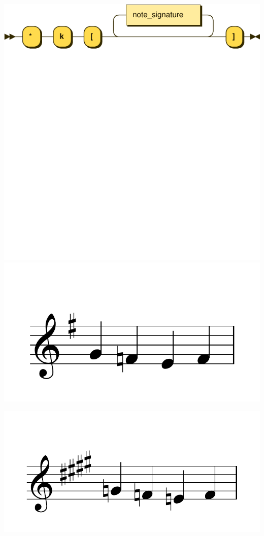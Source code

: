 \documentclass{article}
\begin{document}
\includegraphics[scale=0.5]{figures_railroad/pdf/skern/keysignature.pdf}
\includegraphics[scale=0.5]{figures_tests/pdf/skern/keysignature1.pdf}

\includegraphics[scale=0.5]{figures_tests/pdf/skern/keysignature2.pdf}
\end{document}
